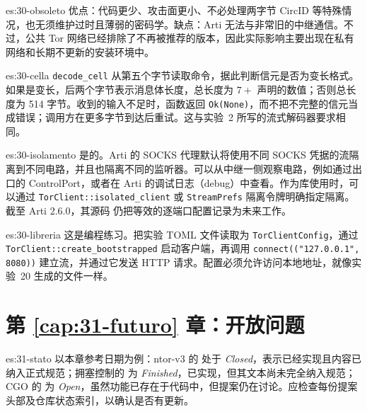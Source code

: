 \begin{soluzione}{es:30-obsoleto}
优点：代码更少、攻击面更小、不必处理两字节 CircID 等特殊情况，也无须维护过时且薄弱的密码学。缺点：Arti 无法与非常旧的中继通信。不过，公共 Tor 网络已经排除了不再被推荐的版本，因此实际影响主要出现在私有网络和长期不更新的安装环境中。
\end{soluzione}

\begin{soluzione}{es:30-cella}
\texttt{decode\_cell} 从第五个字节读取命令，据此判断信元是否为变长格式。如果是变长，后两个字节表示消息体长度，总长度为 $7+$ 声明的数值；否则总长度为 514 字节。收到的输入不足时，函数返回 \texttt{Ok(None)}，而不把不完整的信元当成错误；调用方在更多字节到达后重试。这与实验~2 所写的流式解码器要求相同。
\end{soluzione}

\begin{soluzione}{es:30-isolamento}
是的。Arti 的 SOCKS 代理默认将使用不同 SOCKS 凭据的流隔离到不同电路，并且也隔离不同的监听器。可以从中继一侧观察电路，例如通过出口的 ControlPort，或者在 Arti 的调试日志（debug）中查看。作为库使用时，可以通过 \texttt{TorClient::isolated\_client} 或 \texttt{StreamPrefs} 隔离令牌明确指定隔离。截至 Arti 2.6.0，其源码  仍把等效的逐端口配置记录为未来工作。
\end{soluzione}

\begin{soluzione}{es:30-libreria}
这是编程练习。把实验 TOML 文件读取为 \texttt{TorClientConfig}，通过 \texttt{TorClient::create\_bootstrapped} 启动客户端，再调用 \texttt{connect(("127.0.0.1", 8080))} 建立流，并通过它发送 HTTP 请求。配置必须允许访问本地地址，就像实验~20 生成的文件一样。
\end{soluzione}

\section*{第 \ref{cap:31-futuro} 章：开放问题}

\begin{soluzione}{es:31-stato}
以本章参考日期为例：ntor-v3 的  处于 \emph{Closed}，表示已经实现且内容已纳入正式规范；拥塞控制的  为 \emph{Finished}，已实现，但其文本尚未完全纳入规范；CGO 的  为 \emph{Open}，虽然功能已存在于代码中，但提案仍在讨论。应检查每份提案头部及仓库状态索引，以确认是否有更新。
\end{soluzione}

